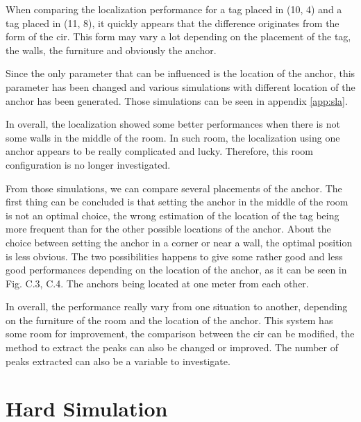 When comparing the localization performance for a tag placed in (10, 4) and a tag placed in (11, 8), it quickly appears that the difference originates from the form of the \gls{cir}. This form may vary a lot depending on the placement of the tag,  the walls, the furniture and obviously the anchor. 
\vspace{2mm}

Since the only parameter that can be influenced is the location of the anchor, this parameter has been changed and various simulations with different location of the anchor has been generated. Those simulations can be seen in appendix \ref{app:sla}.
\vspace{2mm}

In overall, the localization showed some better performances when there is not some walls in the middle of the room. In such room, the localization using one anchor appears to be really complicated and lucky. Therefore, this room configuration is no longer investigated.
\vspace{2mm}

From those simulations, we can compare several placements of the anchor. The first thing can be concluded is that setting the anchor in the middle of the room is not an optimal choice, the wrong estimation of the location of the tag being more frequent than for the other possible locations of the anchor. About the choice between setting the anchor in a corner or near a wall, the optimal position is less obvious. The two possibilities happens to give some rather good and less good performances depending on the location of the anchor, as it can be seen in Fig. C.3, C.4. The anchors being located at one meter from each other.
\vspace{2mm}

In overall, the performance really vary from one situation to another, depending on the furniture of the room and the location of the anchor. This system has some room for improvement, the comparison between the \gls{cir} can be modified, the method to extract the peaks can also be changed or improved. The number of peaks extracted can also be a variable to investigate.


\section{Hard Simulation}


